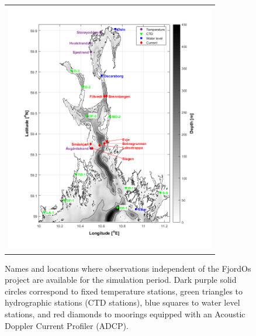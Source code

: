 \begin{figure}[htb]
  \begin{center}
    \begin{tabular}{c}
      \includegraphics*[height=11cm]{Figurer/kart_obs} \\ 
    \end{tabular}
    \caption{\small Names and locations where observations independent of the FjordOs project are available for the simulation period. Dark purple solid circles correspond to fixed temperature stations, green triangles to hydrographic stations (CTD stations), blue squares to water level stations, and red diamonds to moorings equipped with an Acoustic Doppler Current Profiler (ADCP).}
    \label{fig:kart_obs}
  \end{center}
\end{figure}


